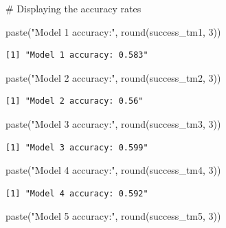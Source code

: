 \documentclass[
  letterpaper,
  DIV=11,
  numbers=noendperiod]{scrartcl}
\newenvironment{Shaded}{\begin{snugshade}}{\end{snugshade}}
\newcommand{\CommentTok}[1]{\textcolor[rgb]{0.37,0.37,0.37}{#1}}
\newcommand{\DecValTok}[1]{\textcolor[rgb]{0.68,0.00,0.00}{#1}}
\newcommand{\FunctionTok}[1]{\textcolor[rgb]{0.28,0.35,0.67}{#1}}
\newcommand{\NormalTok}[1]{\textcolor[rgb]{0.00,0.23,0.31}{#1}}
\newcommand{\StringTok}[1]{\textcolor[rgb]{0.13,0.47,0.30}{#1}}
\begin{document}
\begin{Shaded}
\begin{Highlighting}[]
\CommentTok{\# Displaying the accuracy rates}

\FunctionTok{paste}\NormalTok{(}\StringTok{"Model 1 accuracy:"}\NormalTok{, }\FunctionTok{round}\NormalTok{(success\_tm1, }\DecValTok{3}\NormalTok{))}
\end{Highlighting}
\end{Shaded}

\begin{verbatim}
[1] "Model 1 accuracy: 0.583"
\end{verbatim}

\begin{Shaded}
\begin{Highlighting}[]
\FunctionTok{paste}\NormalTok{(}\StringTok{"Model 2 accuracy:"}\NormalTok{, }\FunctionTok{round}\NormalTok{(success\_tm2, }\DecValTok{3}\NormalTok{))}
\end{Highlighting}
\end{Shaded}

\begin{verbatim}
[1] "Model 2 accuracy: 0.56"
\end{verbatim}

\begin{Shaded}
\begin{Highlighting}[]
\FunctionTok{paste}\NormalTok{(}\StringTok{"Model 3 accuracy:"}\NormalTok{, }\FunctionTok{round}\NormalTok{(success\_tm3, }\DecValTok{3}\NormalTok{))}
\end{Highlighting}
\end{Shaded}

\begin{verbatim}
[1] "Model 3 accuracy: 0.599"
\end{verbatim}

\begin{Shaded}
\begin{Highlighting}[]
\FunctionTok{paste}\NormalTok{(}\StringTok{"Model 4 accuracy:"}\NormalTok{, }\FunctionTok{round}\NormalTok{(success\_tm4, }\DecValTok{3}\NormalTok{))}
\end{Highlighting}
\end{Shaded}

\begin{verbatim}
[1] "Model 4 accuracy: 0.592"
\end{verbatim}

\begin{Shaded}
\begin{Highlighting}[]
\FunctionTok{paste}\NormalTok{(}\StringTok{"Model 5 accuracy:"}\NormalTok{, }\FunctionTok{round}\NormalTok{(success\_tm5, }\DecValTok{3}\NormalTok{))}
\end{Highlighting}
\end{Shaded}
\end{document}
